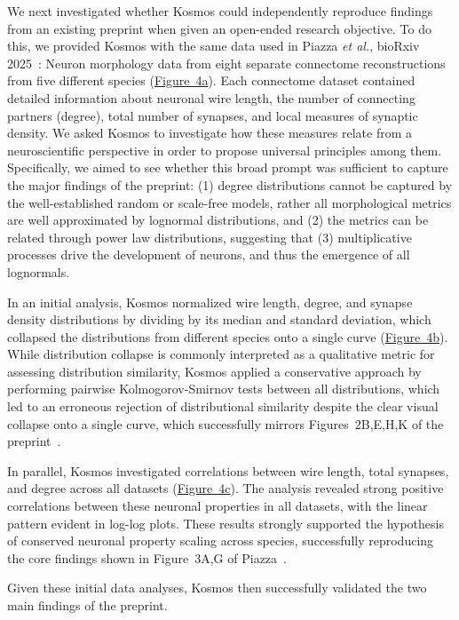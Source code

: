 \documentclass{article}
\begin{document}
We next investigated whether Kosmos could independently reproduce findings from an existing preprint when given an open-ended research objective. To do this, we provided Kosmos with the same data used in Piazza \textit{et al.}, bioRxiv 2025~\cite{piazza_physical_2025}: Neuron morphology data from eight separate connectome reconstructions from five different species (\hyperref[fig:fig4]{Figure~4a}). Each connectome dataset contained detailed information about neuronal wire length, the number of connecting partners (degree), total number of synapses, and local measures of synaptic density. We asked Kosmos to investigate how these measures relate from a neuroscientific perspective in order to propose universal principles among them. Specifically, we aimed to see whether this broad prompt was sufficient to capture the major findings of the preprint: (1) degree distributions cannot be captured by the well-established random or scale-free models, rather all morphological metrics are well approximated by lognormal distributions, and (2) the metrics can be related through power law distributions, suggesting that (3) multiplicative processes drive the development of neurons, and thus the emergence of all lognormals.

In an initial analysis, Kosmos normalized wire length, degree, and synapse density distributions by dividing by its median and standard deviation, which collapsed the distributions from different species onto a single curve (\hyperref[fig:fig4]{Figure~4b}). While distribution collapse is commonly interpreted as a qualitative metric for assessing distribution similarity, Kosmos applied a conservative approach by performing pairwise Kolmogorov-Smirnov tests between all distributions, which led to an erroneous rejection of distributional similarity despite the clear visual collapse onto a single curve, which successfully mirrors Figures~2B,E,H,K of the preprint~\cite{piazza_physical_2025}.

In parallel, Kosmos investigated correlations between wire length, total synapses, and degree across all datasets (\hyperref[fig:fig4]{Figure~4c}). The analysis revealed strong positive correlations between these neuronal properties in all datasets, with the linear pattern evident in log-log plots. These results strongly supported the hypothesis of conserved neuronal property scaling across species, successfully reproducing the core findings shown in Figure~3A,G of Piazza~\cite{piazza_physical_2025}.

Given these initial data analyses, Kosmos then successfully validated the two main findings of the preprint. 
\end{document}
